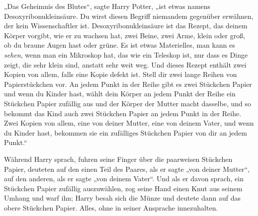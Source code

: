„Das Geheimnis des Blutes“, sagte Harry Potter, „ist etwas namens Desoxyribonukleinsäure. Du wirst diesen Begriff niemandem gegenüber erwähnen, der kein Wissenschaftler ist. Desoxyribonukleinsäure ist das Rezept, das deinem Körper vorgibt, wie er zu wachsen hat, zwei Beine, zwei Arme, klein oder groß, ob du braune Augen hast oder grüne. Es ist etwas Materielles, man kann es \emph{sehen}, wenn man ein Mikroskop hat, das wie ein Teleskop ist, nur dass es Dinge zeigt, die sehr klein sind, anstatt sehr weit weg. Und dieses Rezept enthält zwei Kopien von allem, falls eine Kopie defekt ist. Stell dir zwei lange Reihen von Papierstückchen vor. An jedem Punkt in der Reihe gibt es zwei Stückchen Papier und wenn du Kinder hast, wählt dein Körper an jedem Punkt der Reihe ein Stückchen Papier zufällig aus und der Körper der Mutter macht dasselbe, und so bekommt das Kind auch zwei Stückchen Papier an jedem Punkt in der Reihe. Zwei Kopien von allem, eine von deiner Mutter, eine von deinem Vater, und wenn du Kinder hast, bekommen sie ein zufälliges Stückchen Papier von dir an jedem Punkt.“

Während Harry sprach, fuhren seine Finger über die paarweisen Stückchen Papier, deuteten auf den einen Teil des Paares, als er sagte „von deiner Mutter“, auf den anderen, als er sagte „von deinem Vater“. Und als er davon sprach, ein Stückchen Papier zufällig auszuwählen, zog seine Hand einen Knut aus seinem Umhang und warf ihn; Harry besah sich die Münze und deutete dann auf das obere Stückchen Papier. Alles, ohne in seiner Ansprache innezuhalten.

